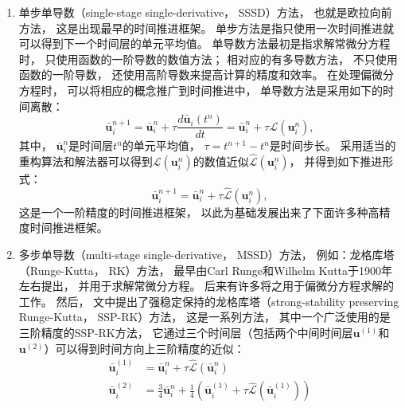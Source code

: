 \begin{enumerate}
  \item 单步单导数（single-stage single-derivative，
        SSSD）方法，
        也就是欧拉向前方法，
        这是出现最早的时间推进框架。
        单步方法是指只使用一次时间推进就可以得到下一个时间层的单元平均值。
        单导数方法最初是指求解常微分方程时，
        只使用函数的一阶导数的数值方法；
        相对应的有多导数方法，
        不只使用函数的一阶导数，
        还使用高阶导数来提高计算的精度和效率。
        在处理偏微分方程时，
        可以将相应的概念推广到时间推进中，
        单导数方法是采用如下的时间离散：
        \begin{equation}
          \bar{\bm{u}}_i^{n+1} = \bar{\bm{u}}_i^{n} + \tau \frac{d \bar{\bm{u}}_i(t^n)}{dt} = \bar{\bm{u}}_i^{n} + \tau \mathcal{L}({\bm{u}}_i^n),
        \end{equation}
        其中，
        $\bar{\bm{u}}_i^{n}$是时间层$t^n$的单元平均值，
        $\tau=t^{n+1}-t^n$是时间步长。
        采用适当的重构算法和解法器可以得到$\mathcal{L}({\bm{u}}_i^n)$的数值近似$\hat{\mathcal{L}}({\bm{u}}_i^n)$，
        并得到如下推进形式：
        \begin{equation}
          \label{eq:euler-forward}
          \bar{\bm{u}}_i^{n+1} = \bar{\bm{u}}_i^{n} + \tau \hat{\mathcal{L}}({\bm{u}}_i^n),
        \end{equation}
        这是一个一阶精度的时间推进框架，
        以此为基础发展出来了下面许多种高精度时间推进框架。
  \item 多步单导数（multi-stage single-derivative，
        MSSD）方法，
        例如：龙格库塔（Runge-Kutta，
        RK）方法，
        最早由Carl Runge和Wilhelm Kutta于1900年左右提出，
        并用于求解常微分方程。
        后来有许多将之用于偏微分方程求解的工作。
        然后，
        文\cite{SSP-2011}中提出了强稳定保持的龙格库塔（strong-stability preserving Runge-Kutta，
        SSP-RK）方法，
        这是一系列方法，
        其中一个广泛使用的是三阶精度的SSP-RK方法，
        它通过三个时间层（包括两个中间时间层${\bm{u}}^{(1)}$和${\bm{u}}^{(2)}$）可以得到时间方向上三阶精度的近似：
        \begin{align}
          \bar{\bm{u}}_i^{(1)} & = \bar{\bm{u}}_i^{n} + \tau \hat{\mathcal{L}}(\bar{\bm{u}}_i^{n})                                                               \\
          \bar{\bm{u}}_i^{(2)} & = \frac{3}{4} \bar{\bm{u}}_i^n + \frac{1}{4} \left(\bar{\bm{u}}_i^{(1)} + \tau \hat{\mathcal{L}}(\bar{\bm{u}}_i^{(1)})\right)   \\

\end{align}
\end{enumerate}

